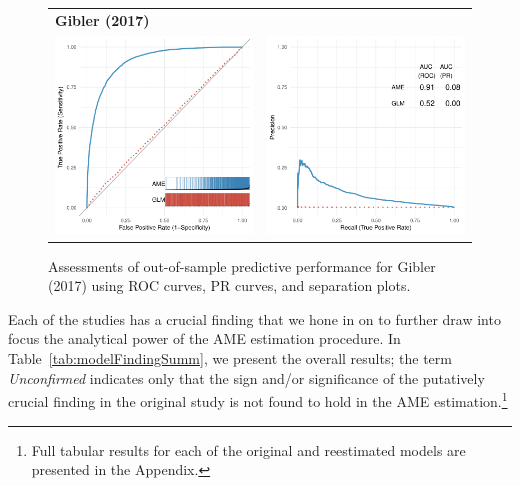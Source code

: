 \begin{figure}
\begin{tabular}{cc}
		\multicolumn{2}{l}{\textbf{Gibler (2017)}} \\
		\includegraphics[width=.4\textwidth]{graphics/gibler_roc_outSample.pdf} & 
		\includegraphics[width=.4\textwidth]{graphics/gibler_pr_outSample.pdf} \\
	\end{tabular}
	\caption{Assessments of out-of-sample predictive performance for Gibler (2017) using ROC curves, PR curves, and separation plots.}
	\label{fig:perf}	
\end{figure}

Each of the studies has a crucial finding that we hone in on to further draw into focus the analytical power of the AME estimation procedure.  In Table~\ref{tab:modelFindingSumm}, we present the overall results; the term \textit{Unconfirmed} indicates only that the sign and/or significance of the putatively crucial finding in the original study is not found to hold in the AME estimation.\footnote{Full tabular results for each of the original and reestimated models are presented in the Appendix.}

